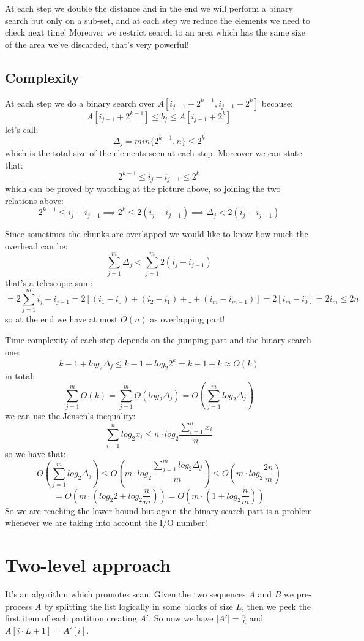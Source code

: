 At each step we double the distance and in the end we will perform a binary search but only on a sub-set, and at each step we reduce the elements we need to check next time!
Moreover we restrict search to an area which has the same size of the area we've discarded, that's very powerful!

\subsection{Complexity}
At each step we do a binary search over $A[i_{j-1} + 2^{k-1}, i_{j-1} + 2^k]$ because:
$$
    A[i_{j-1} + 2^{k-1}] \leq b_j \leq A[i_{j-1} + 2^k]
$$
let's call:
$$
    \Delta_j = min\{ 2^{k-1}, n \} \leq 2^{k}
$$
which is the total size of the elements seen at each step.
Moreover we can state that:
$$
    2^{k-1} \leq i_j - i_{j-1} \leq 2^k
$$
which can be proved by watching at the picture above, so joining the two relations above:
$$
    2^{k-1} \leq i_j - i_{j-1} \implies 2^k \leq 2(i_j - i_{j-1}) \implies \Delta_j < 2(i_j - i_{j-1})
$$

Since sometimes the chunks are overlapped we would like to know how much the overhead can be:
$$
    \sum_{j=1}^m \Delta_j < \sum_{j=1}^m 2(i_j - i_{j-1})
$$
that's a telescopic sum:
$$
    = 2\sum_{j=1}^m i_j - i_{j-1} = 2[(i_1 - i_0) + (i_2 - i_1) + \_ + (i_m - i_{m-1})] = 2[i_m - i_0] = 2i_m \leq 2n
$$
so at the end we have at most $O(n)$ as overlapping part!

Time complexity of each step depends on the jumping part and the binary search one:
$$
    k-1 + log_2 \Delta_j \leq k-1 + log_2 2^{k} = k-1 + k \approx O(k)
$$
in total:
$$
    \sum_{j=1}^m O(k) = \sum_{j=1}^m O(log_2 \Delta_j) = O \left( \sum_{j=1}^m log_2 \Delta_j \right)
$$
we can use the Jensen's inequality:
$$
    \sum_{i=1}^n log_2 x_i \leq n \cdot log_2 \frac{\sum_{i=1}^n x_i}{n}
$$
so we have that:
$$
    O \left( \sum_{j=1}^m log_2 \Delta_j \right) \leq O\left( m \cdot log_2 \frac{\sum_{j=1}^m log_2 \Delta_j}{m} \right) \leq O\left( m \cdot log_2 \frac{2n}{m} \right)
$$
$$    
    = O\left(m \cdot \left(log_2 2 + log_2 \frac{n}{m}\right)\right) = O\left(m \cdot \left(1 + log_2 \frac{n}{m}\right)\right)
$$
So we are reaching the lower bound but again the binary search part is a problem whenever we are taking into account the I/O number!


\section{Two-level approach}
It's an algorithm which promotes scan.
Given the two sequences $A$ and $B$ we pre-process $A$ by splitting the list logically in some blocks of size $L$, then we peek the first item of each partition creating $A'$.
So now we have $|A'| = \frac{n}{L}$ and $A[i \cdot L + 1] = A'[i]$.

